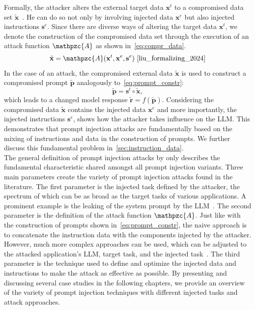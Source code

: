 Formally, the attacker alters the external target data $\textbf{x}^t$ to a compromised data set $\tilde{\textbf{x}}$~\cite{liu_formalizing_2024}.
He can do so not only by involving injected data $\textbf{x}^e$ but also injected instructions $\textbf{s}^e$.
Since there are diverse ways of altering the target data $\textbf{x}^t$, we denote the construction of the compromised data set through the execution of an attack function $\mathpzc{A}$ as shown in~\cref{eq:compr_data}.
\begin{equation}
    \tilde{\textbf{x}} = \mathpzc{A}(\textbf{x}^t, \textbf{x}^e, \textbf{s}^e)~\cite{liu_formalizing_2024}
    \label{eq:compr_data}
\end{equation}
In the case of an attack, the compromised external data $\tilde{\textbf{x}}$ is used to construct a compromised prompt $\tilde{\textbf{p}}$ analogously to~\cref{eq:prompt_constr}:
\begin{equation}
    \tilde{\textbf{p}} = \textbf{s}^t \circ \tilde{\textbf{x}},
    \label{eq:compr_prompt_constr}
\end{equation}
which leads to a changed model response $\tilde{\textbf{r}} = f(\tilde{\textbf{p}})$. Considering the compromised data $\tilde{\textbf{x}}$ contains the injected data $\textbf{x}^e$ and more importantly, the injected instructions $\textbf{s}^e$, shows how the attacker takes influence on the LLM.
This demonstrates that prompt injection attacks are fundamentally based on the mixing of instructions and data in the construction of prompts.
We further discuss this fundamental problem in~\cref{sec:instruction_data}.\\

The general definition of prompt injection attacks by \liu only describes the fundamental characteristic shared amongst all prompt injection variants.
Three main parameters create the variety of prompt injection attacks found in the literature.
The first parameter is the injected task defined by the attacker, the spectrum of which can be as broad as the target tasks of various applications.
A prominent example is the leaking of the system prompt by the LLM~\cite{editor_llm072025_nodate, hui_pleak_2024}.
The second parameter is the definition of the attack function $\mathpzc{A}$.
Just like with the construction of prompts shown in~\cref{eq:prompt_constr}, the naive approach is to concatenate the instruction data with the components injected by the attacker.
However, much more complex approaches can be used, which can be adjusted to the attacked application's LLM, target task, and the injected task~\cite{liu_formalizing_2024}.
The third parameter is the technique used to define and optimize the injected data and instructions to make the attack as effective as possible.
By presenting and discussing several case studies in the following chapters, we provide an overview of the variety of prompt injection techniques with different injected tasks and attack approaches.

